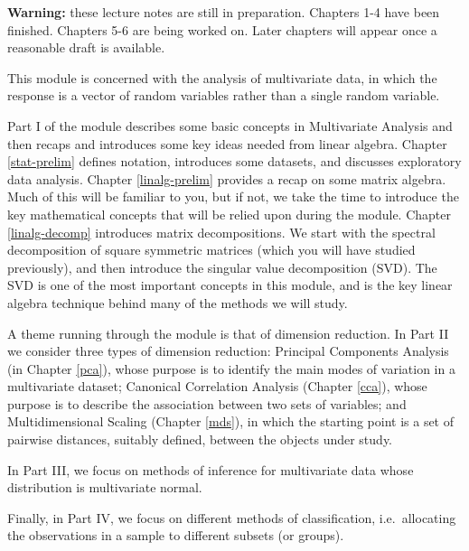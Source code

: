 \documentclass[]{book}
\theoremstyle{definition}
\theoremstyle{definition}
\theoremstyle{definition}
\theoremstyle{remark}
\begin{document}
\newcommand{\tcov}{\text{cov}}
\newcommand{\texp}{\text{exp}}
\newcommand{\lb}{\left(}
\newcommand{\rb}{\right)}
\newcommand{\lsb}{\left[}
\newcommand{\rsb}{\right]}
\newcommand{\BE}{{\mathbb{E}}}
\newcommand{\cov}{{\mathbb{C}\operatorname{ov}}}
\newcommand{\var}{{\mathbb{V}\operatorname{ar}}}

\textbf{Warning:} these lecture notes are still in preparation. Chapters 1-4 have been finished. Chapters 5-6 are being worked on. Later chapters will appear once a reasonable draft is available.

This module is concerned with the analysis of multivariate data, in which the response is a vector of random variables rather than a single random variable.

Part I of the module describes some basic concepts in Multivariate Analysis and then recaps and introduces some key ideas needed from linear algebra.
Chapter \ref{stat-prelim} defines notation, introduces some datasets, and discusses exploratory data analysis. Chapter \ref{linalg-prelim} provides a recap on some matrix algebra. Much of this will be familiar to you, but if not, we take the time to introduce the key mathematical concepts that will be relied upon during the module. Chapter \ref{linalg-decomp} introduces matrix decompositions. We start with the spectral decomposition of square symmetric matrices (which you will have studied previously), and then introduce the singular value decomposition (SVD). The SVD is one of the most important concepts in this module, and is the key linear algebra technique behind many of the methods we will study.

A theme running through the module is that of dimension reduction. In Part II we consider three types of dimension reduction: Principal Components Analysis (in Chapter \ref{pca}),
whose purpose is to identify the main modes of variation in a multivariate dataset; Canonical Correlation Analysis (Chapter \ref{cca}), whose purpose is to describe the association between two sets of variables; and Multidimensional Scaling (Chapter \ref{mds}), in which the starting point is a set of pairwise distances, suitably defined, between the objects under study.

In Part III, we focus on methods of inference for multivariate data whose distribution is multivariate normal.

Finally, in Part IV, we focus on different methods of classification, i.e.~allocating the observations in a sample to different subsets (or groups).
\end{document}
